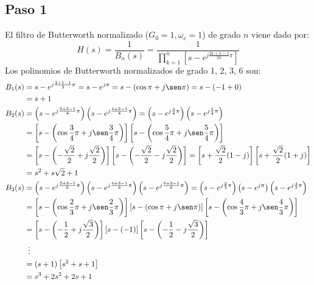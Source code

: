 \documentclass[a4paper]{article}
\begin{document}
\subsection*{Paso 1}
El filtro de Butterworth normalizado ($G_0=1, \omega_c=1$) de grado $n$ viene
dado por:
\begin{equation*}
H(s)=\frac{1}{B_n(s)}=
	\frac{1}{\prod_{k=1}^n\left[s-e^{j\frac{2k+n-1}{2n}\pi}\right]}
\end{equation*}
Los polinomios de Butterworth normalizados de grado 1, 2, 3, 6 son:
\begin{align*}
	B_1(s)&=s-e^{j\frac{2+1-1}{2}\pi}=s-e^{j\pi}=s-(\cos\pi+j\sen\pi)
		=s-(-1+0)\\
		&=s+1\\
	B_2(s)&=\left(s-e^{j\frac{2+2-1}{4}\pi}\right)
		\left(s-e^{j\frac{4+2-1}{4}\pi}\right)
		=\left(s-e^{j\frac{3}{4}\pi}\right)
		\left(s-e^{j\frac{5}{4}\pi}\right)\\
		&=\left[s-\left(\cos\frac{3}{4}\pi+j\sen\frac{3}{4}\pi\right)\right]
		\left[s-\left(\cos\frac{5}{4}\pi+j\sen\frac{5}{4}\pi\right)\right]\\
		&=\left[s-\left(-\frac{\sqrt{2}}{2}+j\frac{\sqrt{2}}{2}\right)\right]
\left[s-\left(-\frac{\sqrt{2}}{2}-j\frac{\sqrt{2}}{2}\right)\right]
		=\left[s+\frac{\sqrt{2}}{2}(1-j)\right]
		\left[s+\frac{\sqrt{2}}{2}(1+j)\right]\\
		&=s^2+s\sqrt{2}+1\\
	B_3(s)&=\left(s-e^{j\frac{2+3-1}{6}\pi}\right)  \left(s-e^{j
		\frac{4+3-1}{6}\pi}\right)  \left(s-e^{j\frac{6+3-1}{6}\pi}\right)
		=\left(s-e^{j\frac{2}{3}\pi}\right)  \left(s-e^{j
		\pi}\right)  \left(s-e^{j\frac{4}{3}\pi}\right)\\
		&=\left[s-\left(\cos\frac{2}{3}\pi+j\sen\frac{2}{3}\pi\right)\right]
		\left[s-\left(\cos\pi+j\sen\pi\right)\right]
		\left[s-\left(\cos\frac{4}{3}\pi+j\sen\frac{4}{3}\pi\right)\right]\\
		&=\left[s-\left(-\frac{1}{2}+j\frac{\sqrt{3}}{2}\right)\right]
		\left[s-\left(-1\right)\right]
		\left[s-\left(-\frac{1}{2}-j\frac{\sqrt{3}}{2}\right)\right]\\
		&\enspace\vdots\\
		&=\left(s+1\right)\left[s^2+s+1\right]\\
		&=s^3+2s^2+2s+1\\
\end{align*}
\end{document}
